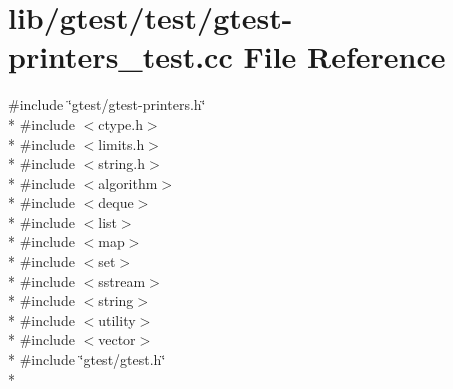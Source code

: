 \hypertarget{gtest-printers__test_8cc}{\section{lib/gtest/test/gtest-\/printers\-\_\-test.cc File Reference}
\label{gtest-printers__test_8cc}
}
{\ttfamily \#include \char`\"{}gtest/gtest-\/printers.\-h\char`\"{}}\\*
{\ttfamily \#include $<$ctype.\-h$>$}\\*
{\ttfamily \#include $<$limits.\-h$>$}\\*
{\ttfamily \#include $<$string.\-h$>$}\\*
{\ttfamily \#include $<$algorithm$>$}\\*
{\ttfamily \#include $<$deque$>$}\\*
{\ttfamily \#include $<$list$>$}\\*
{\ttfamily \#include $<$map$>$}\\*
{\ttfamily \#include $<$set$>$}\\*
{\ttfamily \#include $<$sstream$>$}\\*
{\ttfamily \#include $<$string$>$}\\*
{\ttfamily \#include $<$utility$>$}\\*
{\ttfamily \#include $<$vector$>$}\\*
{\ttfamily \#include \char`\"{}gtest/gtest.\-h\char`\"{}}\\*
